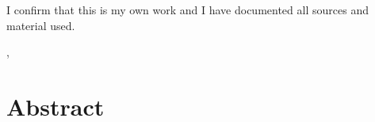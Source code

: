 \thispagestyle{empty}
\vspace*{0.8\textheight}
\noindent
\makeatletter
I confirm that this {\getDoctype} is my own work and I have documented all sources and material used.
\makeatother

\vspace{15mm}
\noindent
\getSubmissionLocation, \getSubmissionDate \hspace{60mm} \getAuthor %

\cleardoublepage{}
\chapter{Abstract}
\getAbstract
\tableofcontents{}
\mainmatter